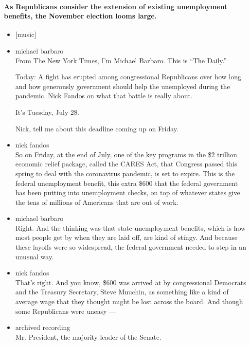 \hypertarget{as-republicans-consider-the-extension-of-existing-unemployment-benefits-the-november-election-looms-large}{%
\paragraph{As Republicans consider the extension of existing
unemployment benefits, the November election looms
large.}\label{as-republicans-consider-the-extension-of-existing-unemployment-benefits-the-november-election-looms-large}}

\begin{itemize}
\item
  {[}music{]}
\item
  michael barbaro\\
  From The New York Times, I'm Michael Barbaro. This is ``The Daily.''

  Today: A fight has erupted among congressional Republicans over how
  long and how generously government should help the unemployed during
  the pandemic. Nick Fandos on what that battle is really about.

  It's Tuesday, July 28.

  Nick, tell me about this deadline coming up on Friday.
\item
  nick fandos\\
  So on Friday, at the end of July, one of the key programs in the \$2
  trillion economic relief package, called the CARES Act, that Congress
  passed this spring to deal with the coronavirus pandemic, is set to
  expire. This is the federal unemployment benefit, this extra \$600
  that the federal government has been putting into unemployment checks,
  on top of whatever states give the tens of millions of Americans that
  are out of work.
\item
  michael barbaro\\
  Right. And the thinking was that state unemployment benefits, which is
  how most people get by when they are laid off, are kind of stingy. And
  because these layoffs were so widespread, the federal government
  needed to step in an unusual way.
\item
  nick fandos\\
  That's right. And you know, \$600 was arrived at by congressional
  Democrats and the Treasury Secretary, Steve Mnuchin, as something like
  a kind of average wage that they thought might be lost across the
  board. And though some Republicans were uneasy ---
\item
  archived recording\\
  Mr. President, the majority leader of the Senate.
\end{itemize}

